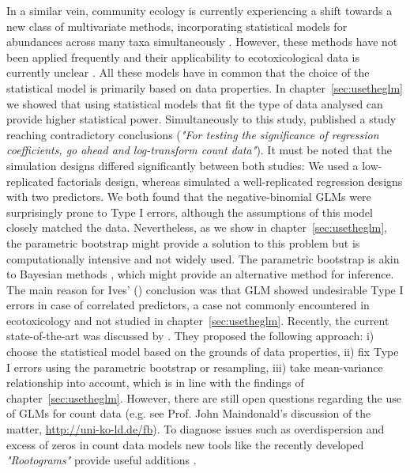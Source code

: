 In a similar vein, community ecology is currently experiencing a shift towards a new class of multivariate methods, incorporating statistical models for abundances across many taxa simultaneously \citep{warton_model-based_2015, warton_distance-based_2012, warton_so_2015, ter_braak_topics_2014}.
However, these methods have not been applied frequently and their applicability to ecotoxicological data is currently unclear \citep{szocs_analysing_2015}. 
All these models have in common that the choice of the statistical model is primarily based on data properties. 
In chapter~\ref{sec:usetheglm} we showed that using statistical models that fit the type of data analysed can provide higher statistical power.
Simultaneously to this study, \citet{ives_for_2015} published a study reaching contradictory conclusions (\emph{"For testing the significance of regression coefficients, go ahead and log-transform count data"}). 
It must be noted that the simulation designs differed significantly between both studies: We used a low-replicated factorials design, whereas \citet{ives_for_2015} simulated a well-replicated regression designs with two predictors.
We both found that the negative-binomial GLMs were surprisingly prone to Type I errors, although the assumptions of this model closely matched the data.
Nevertheless, as we show in chapter~\ref{sec:usetheglm}, the parametric bootstrap might provide a solution to this problem but is computationally intensive and not widely used.
The parametric bootstrap is akin to Bayesian methods \citep{gelman_bayesian_2014}, which might provide an alternative method for inference.
The main reason for Ives' (\citeyear{ives_for_2015}) conclusion was that GLM showed undesirable Type I errors in case of correlated predictors, a case not commonly encountered in ecotoxicology and not studied in chapter~\ref{sec:usetheglm}.
Recently, the current state-of-the-art was discussed by \citet{warton_three_2016}. They proposed the following approach: i) choose the statistical model based on the grounds of data properties, ii) fix Type I errors using the parametric bootstrap or resampling, iii) take mean-variance relationship into account, which is in line with the findings of chapter~\ref{sec:usetheglm}.
However, there are still open questions regarding the use of GLMs for count data (e.g. see Prof. John Maindonald's discussion of the matter, \url{http://uni-ko-ld.de/fb}).
To diagnose issues such as overdispersion and excess of zeros in count data models new tools like the recently developed \emph{"Rootograms"} provide useful additions \citep{kleiber_visualizing_2016}.

